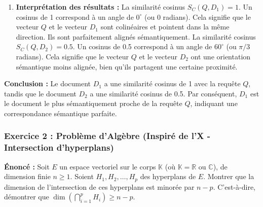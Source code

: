 \documentclass[11pt,a4paper]{report}
\begin{document}
\begin{enumerate}
  \begin{itemize}
  \item
    \textbf{Similarité entre \(Q\) et \(D_1\) :}
    \(S_C(Q, D_1) = \frac{\langle Q, D_1 \rangle}{\|Q\| \|D_1\|}\)
    \(S_C(Q, D_1) = \frac{4}{\sqrt{2} \times 2\sqrt{2}}\)
    \(S_C(Q, D_1) = \frac{4}{2 \times 2}\) \(S_C(Q, D_1) = \frac{4}{4}\)
    \(S_C(Q, D_1) = 1\)
  \item
    \textbf{Similarité entre \(Q\) et \(D_2\) :}
    \(S_C(Q, D_2) = \frac{\langle Q, D_2 \rangle}{\|Q\| \|D_2\|}\)
    \(S_C(Q, D_2) = \frac{1}{\sqrt{2} \times \sqrt{2}}\)
    \(S_C(Q, D_2) = \frac{1}{2}\) \(S_C(Q, D_2) = 0.5\)
  \end{itemize}
\item
  \textbf{Interprétation des résultats :} La similarité cosinus
  \(S_C(Q, D_1) = 1\). Un cosinus de 1 correspond à un angle de
  \(0^\circ\) (ou \(0\) radians). Cela signifie que le vecteur \(Q\) et
  le vecteur \(D_1\) sont colinéaires et pointent dans la même
  direction. Ils sont parfaitement alignés sémantiquement. La similarité
  cosinus \(S_C(Q, D_2) = 0.5\). Un cosinus de 0.5 correspond à un angle
  de \(60^\circ\) (ou \(\pi/3\) radians). Cela signifie que le vecteur
  \(Q\) et le vecteur \(D_2\) ont une orientation sémantique moins
  alignée, bien qu'ils partagent une certaine proximité.
\end{enumerate}

\textbf{Conclusion :} Le document \(D_1\) a une similarité cosinus de 1
avec la requête \(Q\), tandis que le document \(D_2\) a une similarité
cosinus de 0.5. Par conséquent, \(D_1\) est le document le plus
sémantiquement proche de la requête \(Q\), indiquant une correspondance
sémantique parfaite.

\hypertarget{exercice-2-probluxe8me-dalguxe8bre-inspiruxe9-de-lx---intersection-dhyperplans}{%
\subsubsection{Exercice 2 : Problème d'Algèbre (Inspiré de l'X -
Intersection
d'hyperplans)}\label{exercice-2-probluxe8me-dalguxe8bre-inspiruxe9-de-lx---intersection-dhyperplans}}

\textbf{Énoncé :} Soit \(E\) un espace vectoriel sur le corps
\(\mathbb{K}\) (où \(\mathbb{K} = \mathbb{R}\) ou \(\mathbb{C}\)), de
dimension finie \(n \ge 1\). Soient \(H_1, H_2, \dots, H_p\) des
hyperplans de \(E\). Montrer que la dimension de l'intersection de ces
hyperplans est minorée par \(n - p\). C'est-à-dire, démontrer que
\(\dim \left(\bigcap_{i=1}^p H_i\right) \ge n - p\).
\end{document}
